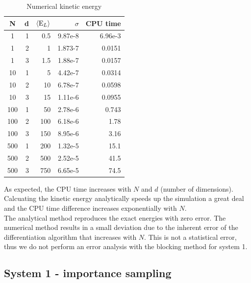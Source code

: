 \documentclass[english, a4paper]{article}
\begin{document}
\begin{table}[H]
\begin{minipage}{.5\linewidth}
   \begin{tabular}{ | c | r | r | r | r |}
    \hline
    N& d& $\langle {\textrm E_L} \rangle$& $\sigma$& CPU time \\*
    \hline
    1& 1& 0.5& 9.87e-8& 6.96e-3 \\*
    \hline
    1& 2& 1& 1.873-7&  0.0151\\*
    \hline
    1& 3& 1.5& 1.88e-7&  0.0157\\*
    \hline
    10& 1& 5& 4.42e-7&  0.0314\\*
    \hline
    10& 2& 10& 6.78e-7&  0.0598\\*
    \hline
    10& 3& 15& 1.11e-6&  0.0955\\*
    \hline
    100& 1& 50& 2.78e-6&  0.743\\*
    \hline
    100& 2& 100& 6.18e-6&  1.78\\*
    \hline
    100& 3& 150& 8.95e-6&  3.16\\*
    \hline
    500& 1& 200& 1.32e-5&  15.1\\*
    \hline
    500& 2& 500& 2.52e-5&  41.5\\*
    \hline
    500& 3& 750& 6.65e-5&  74.5\\*
    \hline
  \end{tabular}
   \caption{Numerical kinetic energy}
    \end{minipage} 
\end{table}
As expected, the CPU time increases with $N$ and $d$ (number of dimensions).
Calcuating the kinetic energy analytically speeds up the simulation a great deal and 
the CPU time difference increases exponentially with $N$.\\

\noindent The analytical method reproduces the exact energies with zero error. 
The numerical method results in a small deviation due to the inherent 
error of the differentiation algorithm that increases with $N$.
This is not a statistical error, thus we do not perform an error analysis with the blocking method
for system 1. 


\subsection{System 1 - importance sampling}
\end{document}
